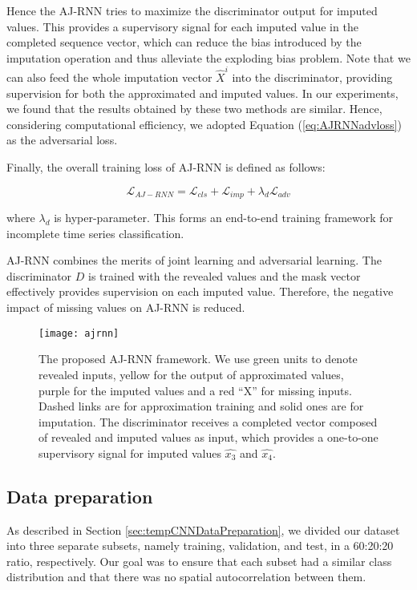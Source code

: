 Hence the AJ-RNN tries to maximize the discriminator output for imputed values.
This provides a supervisory signal for each imputed value in the completed sequence vector, which can reduce the bias introduced by the imputation operation and thus alleviate the exploding bias problem.
Note that we can also feed the whole imputation vector $\hat{X}^i$ into the discriminator, providing supervision for both the approximated and imputed values. 
In our experiments, we found that the results obtained by these two methods are similar. 
Hence, considering computational efficiency, we adopted Equation (\ref{eq:AJRNNadvloss}) as the adversarial loss.

Finally, the overall training loss of AJ-RNN is defined as follows:

\begin{equation}
  \mathcal{L}_{AJ-RNN} = \mathcal{L}_{cls} + \mathcal{L}_{imp} + \lambda_d \mathcal{L}_{adv}
  \label{eq:AJRNNloss}
\end{equation}

where $\lambda_d$ is hyper-parameter. This forms an end-to-end
training framework for incomplete time series classification.

AJ-RNN combines the merits of joint learning and adversarial learning.
The discriminator $D$ is trained with the revealed values and the mask vector effectively provides supervision on each imputed value. 
Therefore, the negative impact of missing values on AJ-RNN is reduced.

\begin{figure}[ht]
  \centering
  \texttt{[image: ajrnn]}
  \caption{The proposed AJ-RNN framework. We use green units to denote revealed inputs, yellow for the output of approximated values, purple for
  the imputed values and a red “X” for missing inputs. Dashed links are for approximation training and solid ones are for imputation. The discriminator
  receives a completed vector composed of revealed and imputed values as input, which provides a one-to-one supervisory signal for imputed values
  $\hat{x_3}$ and $\hat{x_4}$. \cite{ajrnn}}
  \label{fig:AJRNNrchitecture}
\end{figure}

\subsection{Data preparation}
As described in Section \ref{sec:tempCNNDataPreparation}, we divided our dataset into three separate subsets, namely training, validation, and test, in a 60:20:20 ratio, respectively. 
Our goal was to ensure that each subset had a similar class distribution and that there was no spatial autocorrelation between them.


